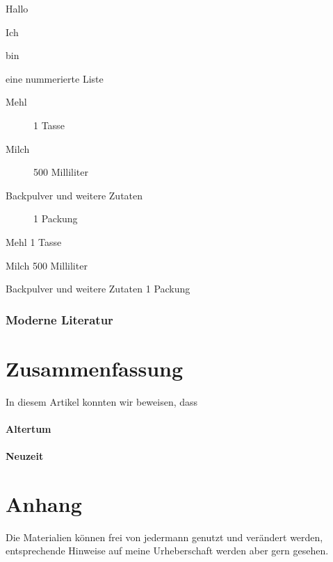\documentclass[ngerman,12pt]{scrartcl}
\begin{document}
\begin{compactenum}
\item Hallo
\item Ich 
\item bin 
\item eine nummerierte Liste
\end{compactenum}

\begin{description}
\item [Mehl] 1 Tasse
\item [Milch] 500 Milliliter
\item [Backpulver und weitere Zutaten] 1 Packung
\end{description}


\begin{compactdesc}
\item [Mehl] 1 Tasse
\item [Milch] 500 Milliliter
\item [Backpulver und weitere Zutaten] 1 Packung
\end{compactdesc}

\subsubsection{Moderne Literatur}

\blindtext[100]

\section{Zusammenfassung}

In diesem Artikel konnten wir beweisen, dass

\paragraph{Altertum} \blindtext

\paragraph{Neuzeit} \blindtext

\section{Anhang}\label{sec:anhang}


Die Materialien können frei von jedermann genutzt und verändert werden, entsprechende Hinweise auf meine Urheberschaft werden aber gern gesehen.
\end{document}
